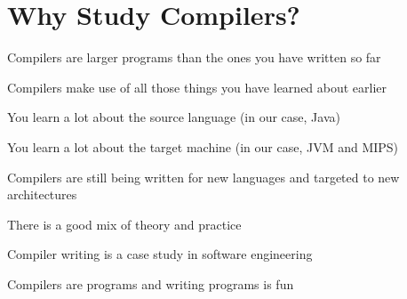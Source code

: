 \documentclass[8pt,a4paper,compress]{beamer}
\begin{document}
\section{Why Study Compilers?}
\begin{frame}[fragile]
\pause\transdissolve

Compilers are larger programs than the ones you have written so far

\pause\transdissolve\bigskip

Compilers make use of all those things you have learned about earlier

\pause\transdissolve\bigskip

You learn a lot about the source language (in our case, Java)

\pause\transdissolve\bigskip

You learn a lot about the target machine (in our case, JVM and MIPS)

\pause\transdissolve\bigskip

Compilers are still being written for new languages and targeted to new architectures

\pause\transdissolve\bigskip

There is a good mix of theory and practice

\pause\transdissolve\bigskip

Compiler writing is a case study in software engineering

\pause\transdissolve\bigskip

Compilers are programs and writing programs is fun
\end{frame}
\end{document}
